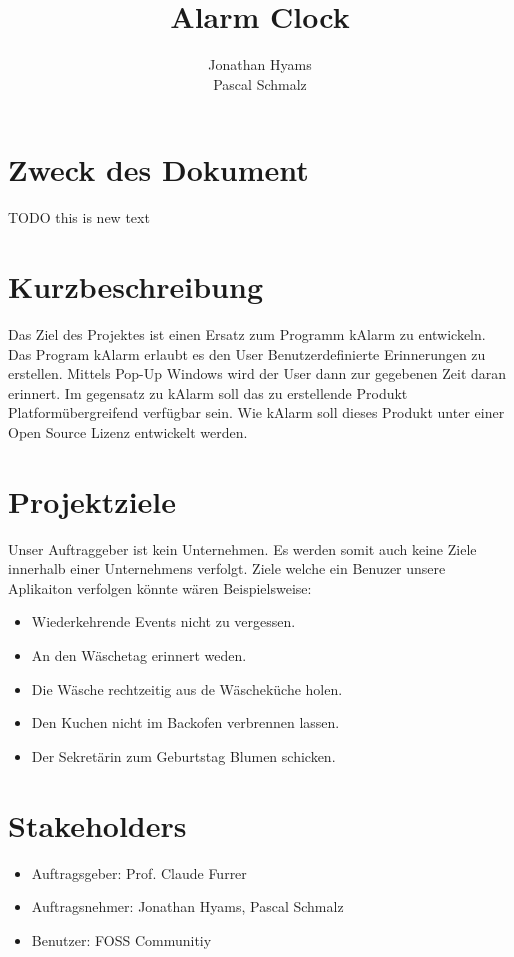 \documentclass[11pt,titelpage]{scrreprt}
\title{Alarm Clock }
\author{Jonathan Hyams \\Pascal Schmalz}
\begin{document}
\thispagestyle{empty}
\maketitle
\tableofcontents

\pagestyle{fancy}


\begin{abstract}
\end{abstract}
\section{Zweck des Dokument}
TODO this is new text

\section{Kurzbeschreibung}
Das Ziel des Projektes ist einen Ersatz zum Programm kAlarm zu entwickeln.
Das Program kAlarm erlaubt es den User Benutzerdefinierte Erinnerungen zu erstellen. Mittels Pop-Up Windows wird der User dann zur gegebenen Zeit daran erinnert.
Im gegensatz zu kAlarm soll das zu erstellende Produkt Platformübergreifend verfügbar sein. Wie kAlarm soll dieses Produkt unter einer Open Source Lizenz entwickelt werden.
\section{Projektziele}
Unser Auftraggeber ist kein Unternehmen. Es werden somit auch keine Ziele innerhalb einer Unternehmens verfolgt.
Ziele welche ein Benuzer unsere Aplikaiton verfolgen könnte wären Beispielsweise:
\begin{itemize}
 \item Wiederkehrende Events nicht zu vergessen.
 \item An den Wäschetag erinnert weden.
 \item Die Wäsche rechtzeitig aus de Wäscheküche holen.
\item Den Kuchen nicht im Backofen verbrennen lassen.
 \item Der Sekretärin zum Geburtstag Blumen schicken.

\end{itemize}

\section{Stakeholders}
\begin{itemize}
\item{Auftragsgeber: Prof. Claude Furrer}
\item{Auftragsnehmer: Jonathan Hyams, Pascal Schmalz}
\item{Benutzer: FOSS Communitiy}
\end{itemize}
\end{document}
